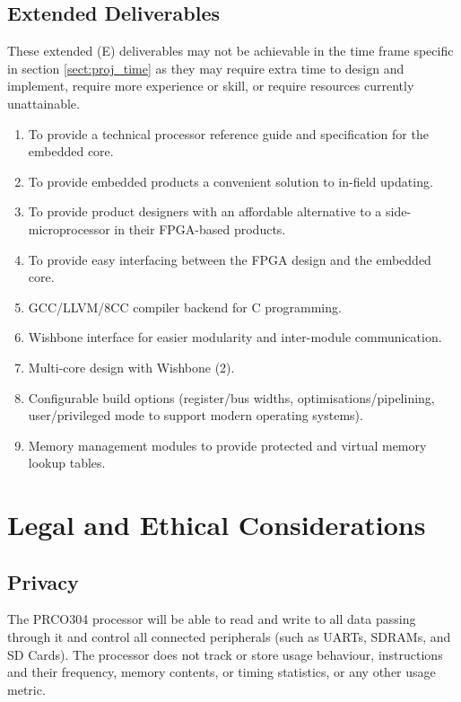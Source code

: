 \documentclass[11pt,a4paper]{report}
\newcommand{\scname}{PRCO304}
\begin{document}

\subsection{Extended Deliverables}
These extended (E) deliverables may not be achievable in the time frame specific in section \ref{sect:proj_time} as they may require extra time to design and implement, require more experience or skill, or require resources currently unattainable.
\begin{enumerate}[label=\bfseries E\arabic*.]
\item{To provide a technical processor reference guide and specification for the embedded core.}
\item{To provide embedded products a convenient solution to in-field updating.}
\item{To provide product designers with an affordable alternative to a side-microprocessor in their FPGA-based products.}
\item{To provide easy interfacing between the FPGA design and the embedded core.}
\item{GCC/LLVM/8CC compiler backend for C programming.}\label{sect:deliv:ed:gcc}
\item{Wishbone interface for easier modularity and inter-module communication.}
\item{Multi-core design with Wishbone (2).}
\item{Configurable build options (register/bus widths, optimisations/pipelining, user/privileged mode to support modern operating systems).}
\item{Memory management modules to provide protected and virtual memory lookup tables.}
\end{enumerate}


\newpage
\section{Legal and Ethical Considerations}
\subsection{Privacy}
The \scname{} processor will be able to read and write to all data passing through it and control all connected peripherals (such as UARTs, SDRAMs, and SD Cards). The processor does not track or store usage behaviour, instructions and their frequency,   memory contents, or timing statistics, or any other usage metric.
\end{document}
